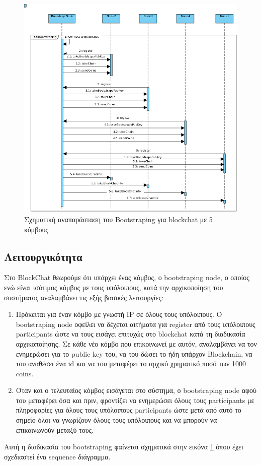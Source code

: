 \documentclass[12pt, a4paper]{article}
\begin{document}
		\begin{figure}[t!]
		\centering
		\includegraphics[width=6.5in]{bootstraping.png}
		\caption{Σχηματική αναπαράσταση του Bootstraping για blockchat με 5 κόμβους}
		\label{fig:bootstraping}
	\end{figure}
	\subsection{Λειτουργικότητα}
	Στο BlockChat θεωρούμε ότι υπάρχει ένας κόμβος, ο bootstraping node, ο οποίος ενώ είναι ισότιμος κόμβος με τους υπόλοιπους, κατά την αρχικοποίηση του συστήματος αναλαμβάνει τις εξής βασικές λειτουργίες:
	\begin{enumerate}
		\item Πρόκειται για έναν κόμβο με γνωστή IP σε όλους τους υπόλοιπους. Ο bootstraping node οφείλει να δέχεται αιτήματα για register από τους υπόλοιπους participants ώστε να τους εισάγει επιτυχώς στο blockchat κατά τη διαδικασία αρχικοποίησης. Σε κάθε νέο κόμβο που επικοινωνεί με αυτόν, αναλαμβάνει να τον ενημερώσει για το public key του, να του δώσει το ήδη υπάρχον Blockchain, να του αναθέσει ένα id και να του μεταφέρει το αρχικό χρηματικό ποσό των 1000 coins.   
		\item Όταν και ο τελευταίος κόμβος εισάγεται στο σύστημα, ο bootstraping node αφού του μεταφέρει όσα και πριν, φροντίζει να ενημερώσει όλους τους participants με πληροφορίες για όλους τους υπόλοιπους participants ώστε μετά από αυτό το σημείο όλοι να γνωρίζουν όλους τους υπόλοιπους και να μπορούν να επικοινωνούν μεταξύ τους. 
	\end{enumerate}
	Αυτή η διαδικασία του bootstraping φαίνεται σχηματικά στην εικόνα \ref{fig:bootstraping} όπου έχει σχεδιαστεί ένα sequence διάγραμμα.
\end{document}
